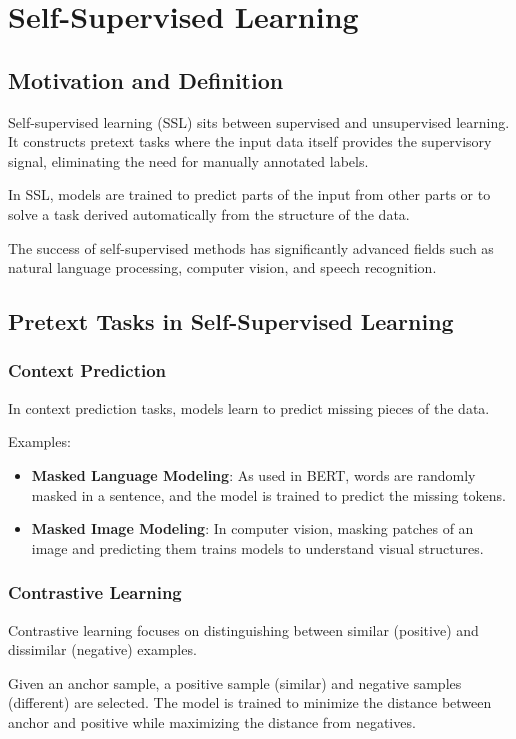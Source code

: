 \documentclass[openany]{book}
\begin{document}
\section{Self-Supervised Learning}

\subsection{Motivation and Definition}
Self-supervised learning (SSL) sits between supervised and unsupervised 
learning. It constructs pretext tasks where the input data itself provides the 
supervisory signal, eliminating the need for manually annotated labels.

In SSL, models are trained to predict parts of the input from other parts or to 
solve a task derived automatically from the structure of the data.

The success of self-supervised methods has significantly advanced fields such as 
natural language processing, computer vision, and speech recognition.

\subsection{Pretext Tasks in Self-Supervised Learning}

\subsubsection{Context Prediction}
In context prediction tasks, models learn to predict missing pieces of the data.

Examples:
\begin{itemize}
    \item \textbf{Masked Language Modeling}: As used in BERT, words are randomly 
    masked in a sentence, and the model is trained to predict the missing 
    tokens.
    \item \textbf{Masked Image Modeling}: In computer vision, masking patches of 
    an image and predicting them trains models to understand visual structures.
\end{itemize}

\subsubsection{Contrastive Learning}
Contrastive learning focuses on distinguishing between similar (positive) and 
dissimilar (negative) examples.

Given an anchor sample, a positive sample (similar) and negative samples 
(different) are selected. The model is trained to minimize the distance between 
anchor and positive while maximizing the distance from negatives.
\end{document}
